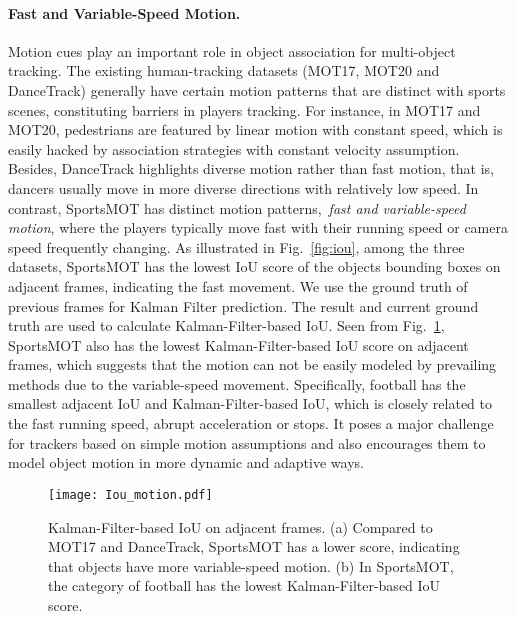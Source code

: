 \documentclass[10pt,twocolumn,letterpaper]{article}
\begin{document}
\vspace{-4mm}
\paragraph{Fast and Variable-Speed Motion.}
Motion cues play an important role in object association for multi-object tracking.
The existing human-tracking datasets (\eg MOT17, MOT20 and DanceTrack) generally have certain motion patterns that are distinct with sports scenes, constituting barriers in players tracking.
For instance, in MOT17 and MOT20, pedestrians are featured by linear motion with constant speed, which is easily hacked by association strategies with constant velocity assumption.
Besides, DanceTrack highlights diverse motion rather than fast motion, that is, dancers usually move in more diverse directions with relatively low speed.
In contrast, SportsMOT has distinct motion patterns,~\ie \emph{fast and variable-speed motion}, where the players typically move fast with their running speed or camera speed frequently changing.
As illustrated in Fig.~\ref{fig:iou}, among the three datasets, SportsMOT has the lowest IoU score of the objects bounding boxes on adjacent frames, indicating the fast movement.
We use the ground truth of previous frames for Kalman Filter prediction. The result and current ground truth are used to calculate Kalman-Filter-based IoU.
Seen from Fig.~\ref{fig:motion-iou}, SportsMOT also has the lowest Kalman-Filter-based IoU score on adjacent frames, which suggests that the motion can not be easily modeled by prevailing methods due to the variable-speed movement.
Specifically, football has the smallest adjacent IoU and Kalman-Filter-based IoU, which is closely related to the fast running speed, abrupt acceleration or stops.
It poses a major challenge for trackers based on simple motion assumptions and also encourages them to model object motion in more dynamic and adaptive ways.

\begin{figure}[pt]
\centering
\texttt{[image: Iou\_motion.pdf]}
\vspace{-8mm}
\caption{Kalman-Filter-based IoU on adjacent frames. (a) Compared to MOT17 and DanceTrack, SportsMOT has a lower score, indicating that objects have more variable-speed motion. (b) In SportsMOT, the category of football has the lowest Kalman-Filter-based IoU score.}
\vspace{-2mm}
\label{fig:motion-iou}
\end{figure}
\end{document}
